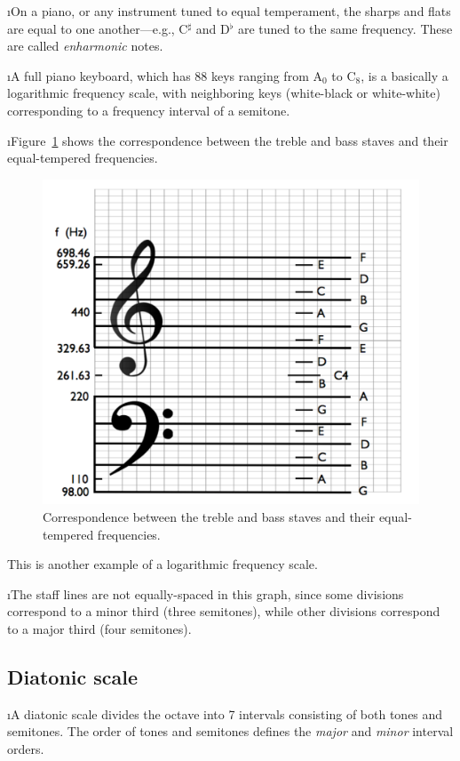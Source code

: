 \i On a piano, or any instrument tuned to
equal temperament, the sharps and flats are equal
to one another---e.g., C${}^\sharp$ and D${}^\flat$
are tuned to the same frequency.
These are called {\em enharmonic} notes.

\i A full piano keyboard, which has 88 keys 
ranging from A$_0$ to C$_8$, 
is a basically a logarithmic
frequency scale, with neighboring keys 
(white-black or white-white) corresponding
to a frequency interval of a semitone.

\i Figure~\ref{f:musical-staves-log-scale}
shows the correspondence between the treble and bass 
staves and their equal-tempered frequencies.
%
\begin{figure}[htbp]
\begin{center}
\includegraphics[width=.8\textwidth]{musical-staves-log-scale}
\caption{Correspondence between the treble and bass 
staves and their equal-tempered frequencies.}
\label{f:musical-staves-log-scale}
\end{center}
\end{figure}
%
This is another example of a logarithmic frequency
scale.

\i The staff lines are not equally-spaced
in this graph, since some divisions correspond to a 
minor third (three semitones), while other divisions
correspond to a major third (four semitones).

\ei
\subsection{Diatonic scale}
\bi

\i A diatonic scale divides the octave into 
7 intervals consisting of both tones and semitones.
The order of tones and semitones 
defines the {\em major} and 
{\em minor} interval orders.

